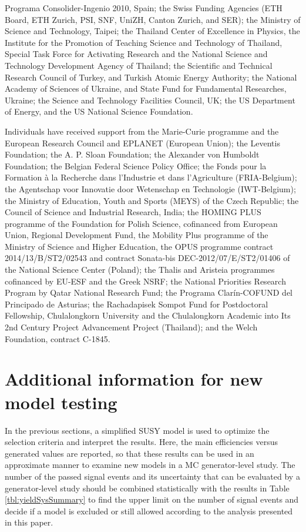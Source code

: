 \begin{acknowledgments}
Programa Consolider-Ingenio 2010, Spain; the Swiss Funding Agencies (ETH Board, ETH Zurich, PSI, SNF, UniZH, Canton Zurich, and SER); the Ministry of Science and Technology, Taipei; the Thailand Center of Excellence in Physics, the Institute for the Promotion of Teaching Science and Technology of Thailand, Special Task Force for Activating Research and the National Science and Technology Development Agency of Thailand; the Scientific and Technical Research Council of Turkey, and Turkish Atomic Energy Authority; the National Academy of Sciences of Ukraine, and State Fund for Fundamental Researches, Ukraine; the Science and Technology Facilities Council, UK; the US Department of Energy, and the US National Science Foundation.

Individuals have received support from the Marie-Curie programme and the European Research Council and EPLANET (European Union); the Leventis Foundation; the A. P. Sloan Foundation; the Alexander von Humboldt Foundation; the Belgian Federal Science Policy Office; the Fonds pour la Formation \`a la Recherche dans l'Industrie et dans l'Agriculture (FRIA-Belgium); the Agentschap voor Innovatie door Wetenschap en Technologie (IWT-Belgium); the Ministry of Education, Youth and Sports (MEYS) of the Czech Republic; the Council of Science and Industrial Research, India; the HOMING PLUS programme of the Foundation for Polish Science, cofinanced from European Union, Regional Development Fund, the Mobility Plus programme of the Ministry of Science and Higher Education, the OPUS programme contract 2014/13/B/ST2/02543 and contract Sonata-bis DEC-2012/07/E/ST2/01406 of the National Science Center (Poland); the Thalis and Aristeia programmes cofinanced by EU-ESF and the Greek NSRF; the National Priorities Research Program by Qatar National Research Fund; the Programa Clar\'in-COFUND del Principado de Asturias; the Rachadapisek Sompot Fund for Postdoctoral Fellowship, Chulalongkorn University and the Chulalongkorn Academic into Its 2nd Century Project Advancement Project (Thailand); and the Welch Foundation, contract C-1845.
\end{acknowledgments}


\appendix
\section{Additional information for new model testing}
\label{sect:model}
In the previous sections, a simplified SUSY model is used to optimize the selection criteria and interpret the results.
Here, the main efficiencies versus generated values are reported, so that these results can be used in
an approximate manner to examine new models in a MC generator-level study.
The number of the passed signal events and its uncertainty that
can be evaluated by a generator-level study
should be combined statistically with the results in Table \ref{tbl:yieldSysSummary} to find the upper limit
on the number of signal events
and decide if a model is excluded or still allowed according to  the analysis presented in this paper.


